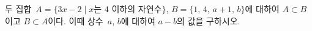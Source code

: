두 집합~$A=\{3x-2 \mid x$는 $4$ 이하의 자연수$\}$, $B=\{1,\,4,\,a+1,\,b\}$에 대하여 $A\subset B$이고 $B\subset A$이다. 이때 상수~$a$, $b$에 대하여 $a-b$의 값을 구하시오. 
